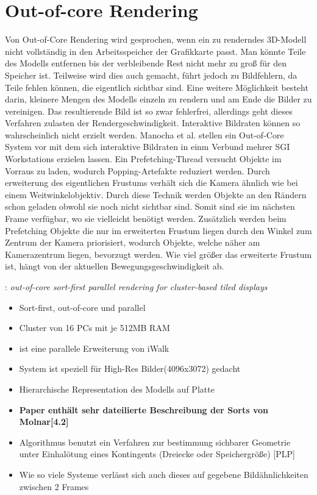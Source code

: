 \section{Out-of-core Rendering}
Von Out-of-Core Rendering wird gesprochen, wenn ein zu renderndes 3D-Modell nicht vollständig in den Arbeitsspeicher der Grafikkarte passt. Man könnte Teile des Modells entfernen bis der verbleibende Rest nicht mehr zu groß für den Speicher ist. Teilweise wird dies auch gemacht, führt jedoch zu Bildfehlern, da Teile fehlen können, die eigentlich sichtbar sind. Eine weitere Möglichkeit besteht darin, kleinere Mengen des Modells einzeln zu rendern und am Ende die Bilder zu vereinigen. Das resultierende Bild ist so zwar fehlerfrei, allerdings geht dieses Verfahren zulasten der Rendergeschwindigkeit. Interaktive Bildraten können so wahrscheinlich nicht erzielt werden.\linebreak
Manocha et al. \cite{manocha} stellen ein Out-of-Core System vor mit dem sich interaktive Bildraten in einm Verbund mehrer SGI Workstations erzielen lassen. Ein Prefetching-Thread versucht Objekte im Vorraus zu laden, wodurch Popping-Artefakte reduziert werden. Durch erweiterung des eigentlichen Frustums verhält sich die Kamera ähnlich wie bei einem Weitwinkelobjektiv. Durch diese Technik werden Objekte an den Rändern schon geladen obwohl sie noch nicht sichtbar sind. Somit sind sie im nächsten Frame verfügbar, wo sie vielleicht benötigt werden. Zusätzlich werden beim Prefetching Objekte die nur im erweiterten Frustum liegen durch den Winkel zum Zentrum der Kamera priorisiert, wodurch Objekte, welche näher am Kamerazentrum liegen, bevorzugt werden. Wie viel größer das erweiterte Frustum ist, hängt von der aktuellen Bewegungsgeschwindigkeit ab.

\cite{wagner1}: \textit{out-of-core sort-first parallel rendering for cluster-based tiled displays}
\begin{itemize}
 \item Sort-first, out-of-core und parallel
 \item Cluster von 16 PCs mit je 512MB RAM
 \item ist eine parallele Erweiterung von iWalk
 \item System ist speziell für High-Res Bilder(4096x3072) gedacht
 \item Hierarchische Representation des Modells auf Platte
 \item \textbf{Paper enthält sehr dateilierte Beschreibung der Sorts von Molnar[4.2]}
 \item Algorithmus benutzt ein Verfahren zur bestimmung sichbarer Geometrie unter Einhalötung eines Kontingents (Dreiecke oder Speichergröße) [PLP]
 \item Wie so viele Systeme verlässt sich auch dieses auf gegebene Bildähnlichkeiten zwischen 2 Frames
\end{itemize}

